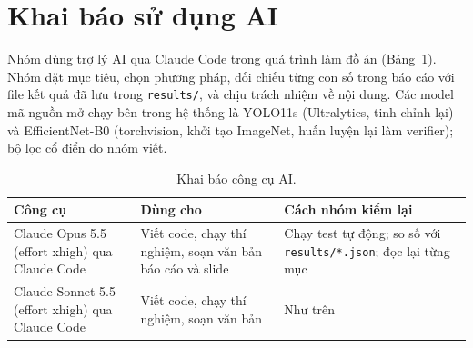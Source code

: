 \section{Khai báo sử dụng AI}\label{sec:ai}

Nhóm dùng trợ lý AI qua Claude Code trong quá trình làm đồ án (Bảng~\ref{tab:ai}). Nhóm đặt mục tiêu, chọn phương pháp, đối chiếu từng con số trong báo cáo với file kết quả đã lưu trong \texttt{results/}, và chịu trách nhiệm về nội dung. Các model mã nguồn mở chạy bên trong hệ thống là YOLO11s (Ultralytics, tinh chỉnh lại) và EfficientNet-B0 (torchvision, khởi tạo ImageNet, huấn luyện lại làm verifier); bộ lọc cổ điển do nhóm viết.

\begin{table}[!htbp]
\centering\footnotesize
\caption{Khai báo công cụ AI.}
\label{tab:ai}
\begin{tabularx}{\textwidth}{@{}>{\raggedright\arraybackslash}p{3.3cm} X X@{}}
\toprule
Công cụ & Dùng cho & Cách nhóm kiểm lại \\
\midrule
Claude Opus 5.5 (effort xhigh) qua Claude Code & Viết code, chạy thí nghiệm, soạn văn bản báo cáo và slide & Chạy test tự động; so số với \texttt{results/*.json}; đọc lại từng mục \\
\addlinespace
Claude Sonnet 5.5 (effort xhigh) qua Claude Code & Viết code, chạy thí nghiệm, soạn văn bản & Như trên \\
\bottomrule
\end{tabularx}
\end{table}
